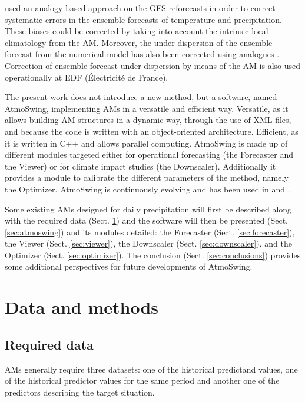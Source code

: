 \documentclass[review]{elsarticle}
\begin{document}
\citet{Hamill2006} used an analogy based approach on the GFS reforecasts in order to correct systematic errors in the ensemble forecasts of temperature and precipitation. These biases could be corrected by taking into account the intrinsic local climatology from the AM. Moreover, the under-dispersion of the ensemble forecast from the numerical model has also been corrected using analogues \citep{Hamill2006}. Correction of ensemble forecast under-dispersion by means of the AM is also used operationally at EDF (\'{E}lectricit\'{e} de France).

The present work does not introduce a new method, but a software, named AtmoSwing, implementing AMs in a versatile and efficient way. Versatile, as it allows building AM structures in a dynamic way, through the use of XML files, and because the code is written with an object-oriented architecture. Efficient, as it is written in C++ and allows parallel computing. AtmoSwing is made up of different modules targeted either for operational forecasting (the Forecaster and the Viewer) or for climate impact studies (the Downscaler). Additionally it provides a module to calibrate the different parameters of the method, namely the Optimizer. AtmoSwing is continuously evolving and has been used in \citet{Horton2012, Horton2017a, Horton2017b, Horton2018a} and \citet{Horton2018b}.

Some existing AMs designed for daily precipitation will first be described along with the required data (Sect. \ref{sec:data_methods}) and the software will then be presented (Sect. \ref{sec:atmoswing}) and its modules detailed: the Forecaster (Sect. \ref{sec:forecaster}), the Viewer (Sect. \ref{sec:viewer}), the Downscaler (Sect. \ref{sec:downscaler}), and the Optimizer (Sect. \ref{sec:optimizer}). The conclusion (Sect. \ref{sec:conclusions}) provides some additional perspectives for future developments of AtmoSwing. 


\section{Data and methods}
\label{sec:data_methods}


\subsection{Required data}
\label{sec:data}

AMs generally require three datasets: one of the historical predictand values, one of the historical predictor values for the same period and another one of the predictors describing the target situation.
\end{document}
